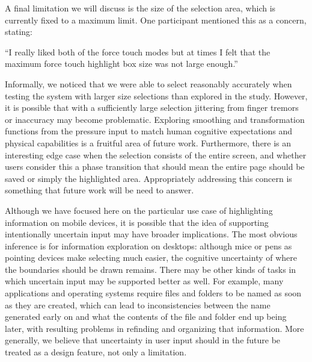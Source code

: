 A final limitation we will discuss is the size of the selection area, which is currently fixed to a maximum limit. One participant mentioned this as a concern, stating: 


``I really liked both of the force touch modes but at times I felt that the maximum force touch highlight box size was not large enough.''

Informally, we noticed that we were able to select reasonably accurately when testing the system with larger size selections than explored in the study. However, it is possible that with a sufficiently large selection jittering from finger tremors or inaccuracy may become problematic. Exploring smoothing and transformation functions from the pressure input to match human cognitive expectations and physical capabilities is a fruitful area of future work. Furthermore, there is an interesting edge case when the selection consists of the entire screen, and whether users consider this a phase transition that should mean the entire page should be saved or simply the highlighted area. Appropriately addressing this concern is something that future work will be need to answer.

Although we have focused here on the particular use case of highlighting information on mobile devices, it is possible that the idea of supporting intentionally uncertain input may have broader implications. The most obvious inference is for information exploration on desktops: although mice or pens as pointing devices make selecting much easier, the cognitive uncertainty of where the boundaries should be drawn remains. There may be other kinds of tasks in which uncertain input may be supported better as well. For example, many applications and operating systems require files and folders to be named as soon as they are created, which can lead to inconsistencies between the name generated early on and what the contents of the file and folder end up being later, with resulting problems in refinding and organizing that information. More generally, we believe that uncertainty in user input should in the future be treated as a design feature, not only a limitation.



